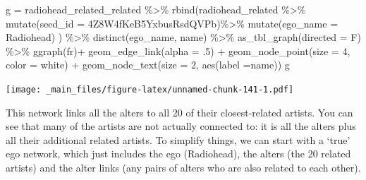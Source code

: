 \documentclass[
]{book}
\newenvironment{Shaded}{\begin{snugshade}}{\end{snugshade}}
\newcommand{\AttributeTok}[1]{\textcolor[rgb]{0.77,0.63,0.00}{#1}}
\newcommand{\DecValTok}[1]{\textcolor[rgb]{0.00,0.00,0.81}{#1}}
\newcommand{\FunctionTok}[1]{\textcolor[rgb]{0.00,0.00,0.00}{#1}}
\newcommand{\NormalTok}[1]{#1}
\newcommand{\OtherTok}[1]{\textcolor[rgb]{0.56,0.35,0.01}{#1}}
\newcommand{\SpecialCharTok}[1]{\textcolor[rgb]{0.00,0.00,0.00}{#1}}
\newcommand{\StringTok}[1]{\textcolor[rgb]{0.31,0.60,0.02}{#1}}
\begin{document}
\begin{Shaded}
\begin{Highlighting}[]
\NormalTok{g }\OtherTok{=}\NormalTok{ radiohead\_related\_related   }\SpecialCharTok{\%\textgreater{}\%} 
  \FunctionTok{rbind}\NormalTok{(radiohead\_related }\SpecialCharTok{\%\textgreater{}\%} 
  \FunctionTok{mutate}\NormalTok{(}\AttributeTok{seed\_id =} \StringTok{\textquotesingle{}4Z8W4fKeB5YxbusRsdQVPb\textquotesingle{}}\NormalTok{)}\SpecialCharTok{\%\textgreater{}\%} 
  \FunctionTok{mutate}\NormalTok{(}\AttributeTok{ego\_name =} \StringTok{\textquotesingle{}Radiohead\textquotesingle{}}\NormalTok{) ) }\SpecialCharTok{\%\textgreater{}\%} 
  \FunctionTok{distinct}\NormalTok{(ego\_name, name) }\SpecialCharTok{\%\textgreater{}\%} 
  \FunctionTok{as\_tbl\_graph}\NormalTok{(}\AttributeTok{directed =}\NormalTok{ F) }\SpecialCharTok{\%\textgreater{}\%} 
  \FunctionTok{ggraph}\NormalTok{(}\StringTok{\textquotesingle{}fr\textquotesingle{}}\NormalTok{)}\SpecialCharTok{+} \FunctionTok{geom\_edge\_link}\NormalTok{(}\AttributeTok{alpha =}\NormalTok{ .}\DecValTok{5}\NormalTok{) }\SpecialCharTok{+} 
  \FunctionTok{geom\_node\_point}\NormalTok{(}\AttributeTok{size =} \DecValTok{4}\NormalTok{, }\AttributeTok{color =} \StringTok{\textquotesingle{}white\textquotesingle{}}\NormalTok{) }\SpecialCharTok{+} 
  \FunctionTok{geom\_node\_text}\NormalTok{(}\AttributeTok{size =} \DecValTok{2}\NormalTok{, }\FunctionTok{aes}\NormalTok{(}\AttributeTok{label =}\NormalTok{name))}
\NormalTok{g}
\end{Highlighting}
\end{Shaded}

\texttt{[image: \_main\_files/figure-latex/unnamed-chunk-141-1.pdf]}

This network links all the alters to all 20 of their closest-related artists. You can see that many of the artists are not actually connected to: it is all the alters plus all their additional related artists. To simplify things, we can start with a `true' ego network, which just includes the ego (Radiohead), the alters (the 20 related artists) and the alter links (any pairs of alters who are also related to each other).
\end{document}
